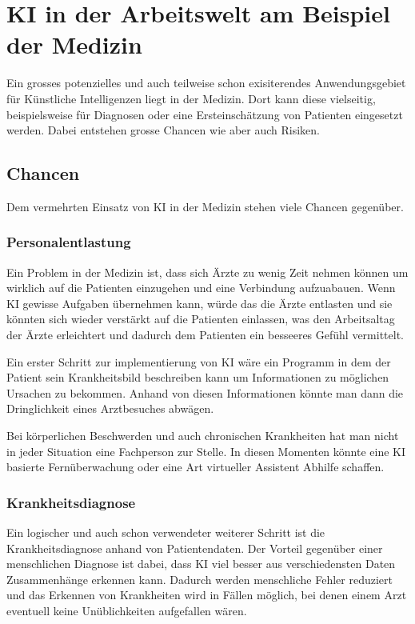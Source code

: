 \chapter{KI in der Arbeitswelt am Beispiel der Medizin}
\label{chap:ai-medicine}

Ein grosses potenzielles und auch teilweise schon exisiterendes Anwendungsgebiet für Künstliche Intelligenzen liegt in der Medizin.
Dort kann diese vielseitig, beispielsweise für Diagnosen oder eine Ersteinschätzung von Patienten eingesetzt werden.
\noindent
Dabei entstehen grosse Chancen wie aber auch Risiken.

\section{Chancen}
Dem vermehrten Einsatz von KI in der Medizin stehen viele Chancen gegenüber.

\subsection{\normalsize{Personalentlastung}}
Ein Problem in der Medizin ist, dass sich Ärzte zu wenig Zeit nehmen können um wirklich auf die Patienten einzugehen und eine Verbindung aufzuabauen.
Wenn KI gewisse Aufgaben übernehmen kann, würde das die Ärzte entlasten und sie könnten sich wieder verstärkt auf die Patienten einlassen, was den Arbeitsaltag der Ärzte erleichtert und dadurch dem Patienten ein besseeres Gefühl vermittelt.

Ein erster Schritt zur implementierung von KI wäre ein Programm in dem der Patient sein Krankheitsbild beschreiben kann um Informationen zu möglichen Ursachen zu bekommen. Anhand von diesen Informationen könnte man dann die Dringlichkeit eines Arztbesuches abwägen.

Bei körperlichen Beschwerden und auch chronischen Krankheiten hat man nicht in jeder Situation eine Fachperson zur Stelle. In diesen Momenten könnte eine KI basierte Fernüberwachung oder eine Art virtueller Assistent Abhilfe schaffen.

\subsection{\normalsize{Krankheitsdiagnose}}
Ein logischer und auch schon verwendeter weiterer Schritt ist die Krankheitsdiagnose anhand von Patientendaten. 
Der Vorteil gegenüber einer menschlichen Diagnose ist dabei, dass KI viel besser aus verschiedensten Daten Zusammenhänge erkennen kann. 
Dadurch werden menschliche Fehler reduziert und das Erkennen von Krankheiten wird in Fällen möglich, bei denen einem Arzt eventuell keine Unüblichkeiten aufgefallen wären.

